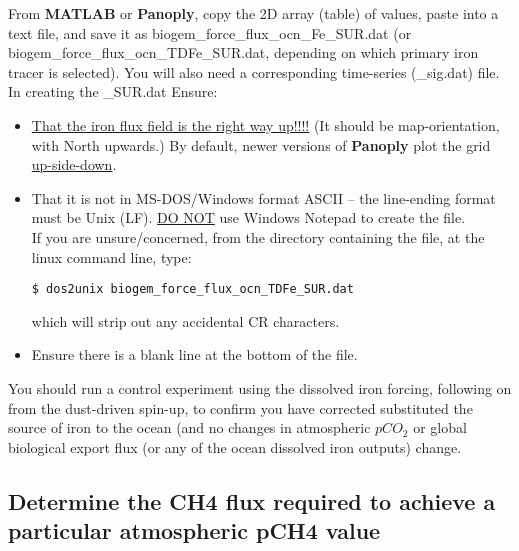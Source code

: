 \documentclass[11pt,fleqn]{book} %
\begin{document}
\begin{enumerate}[noitemsep]
From \textbf{MATLAB} or \textbf{Panoply}, copy the 2D array (table) of values, paste into a text file, and save it as \textsf{\footnotesize biogem\_force\_flux\_ocn\_Fe\_SUR.dat} (or \textsf{\footnotesize biogem\_force\_flux\_ocn\_TDFe\_SUR.dat}, depending on which primary iron tracer is selected). You will also need a corresponding time-series (\textsf{\footnotesize *\_sig.dat}) file. In creating the \textsf{\footnotesize *\_SUR.dat} Ensure:
\vspace{1mm}
\begin{itemize}[noitemsep]
\item \uline{That the iron flux field is the right way up!!!!} (It should be map-orientation, with North upwards.) By default, newer versions of \textbf{Panoply} plot the grid \uline{up-side-down}.
\item That it is not in MS-DOS/Windows format ASCII -- the line-ending format must be Unix (LF). \uline{DO NOT} use Windows Notepad to create the file.
\\If you are unsure/concerned, from the directory containing the file, at the linux command line, type:
\vspace{-1mm}\begin{verbatim}
$ dos2unix biogem_force_flux_ocn_TDFe_SUR.dat
\end{verbatim}\vspace{-1mm}
which will strip out any accidental CR characters.
\item Ensure there is a blank line at the bottom of the file.
\end{itemize}
\vspace{1mm}
You should run a control experiment using the dissolved iron forcing, following on from the dust-driven spin-up, to confirm you have corrected substituted the source of iron to the ocean (and no changes in atmospheric \(pCO_{2}\) or global biological export flux (or any of the ocean dissolved iron outputs) change.
\end{enumerate}
\vspace{1mm}

%
\newpage
\subsection*{Determine the CH4 flux required to achieve a particular atmospheric pCH4 value}
\vspace{1mm}
\end{document}
